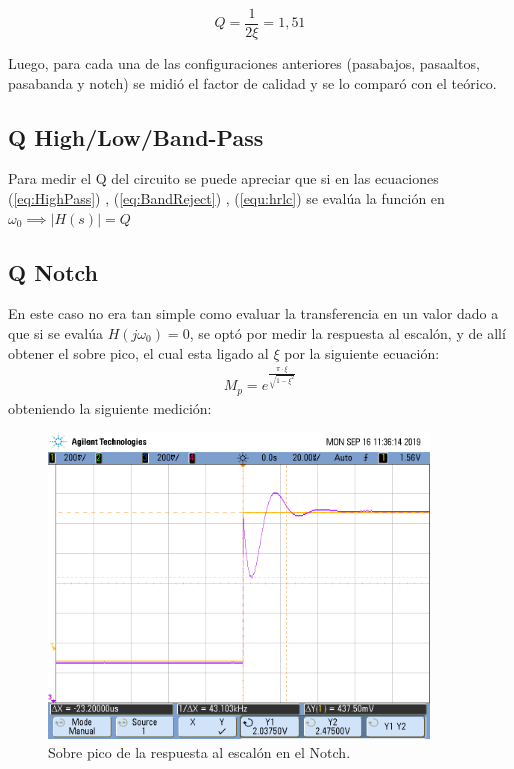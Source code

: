 \begin{equation}
    Q=\frac{1}{2\xi}=1,51
\end{equation}

Luego, para cada una de las configuraciones anteriores (pasabajos, pasaaltos, pasabanda y notch) se midió el factor de calidad y se lo comparó con el teórico.
\subsection{Q High/Low/Band-Pass}
Para medir el Q del circuito se puede apreciar que si en las ecuaciones (\ref{eq:HighPass}) , (\ref{eq:BandReject}) , (\ref{equ:hrlc}) se evalúa la función en $\omega_0 \implies |H(s)|=Q$

\subsection{Q Notch}
En este caso no era tan simple como evaluar la transferencia en un valor dado a que si se evalúa $H(j\omega_0)=0$, se optó por medir la respuesta al escalón, y de allí obtener el sobre pico, el cual esta ligado al $\xi$ por la siguiente ecuación:
\begin{align}M_p = e^{\frac{\pi \cdot \xi}{\sqrt{1-\xi^2}}} \end{align}
obteniendo la siguiente medición:
\begin{figure}[H]
	\centering
	\includegraphics[width=0.9\textwidth]{Mediciones_pendrive_alan/ej4sobrepiconotch.png}
\caption{Sobre pico de la respuesta al escalón en el Notch.}
	\label{fig:Overshoot5}
\end{figure}


